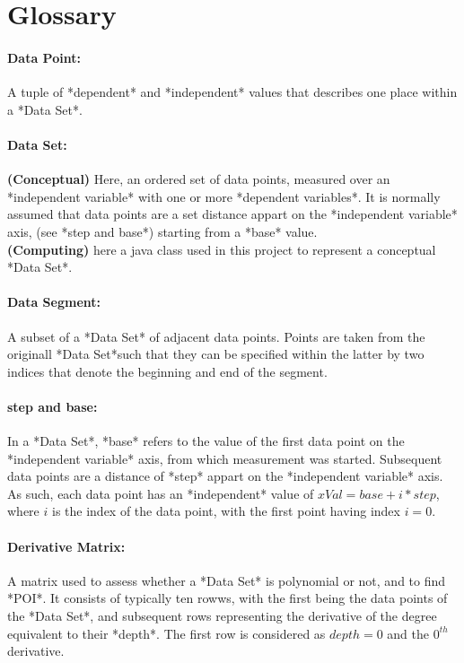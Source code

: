 \documentclass[main.tex]{subfiles}
\begin{document}
  
  \section{Glossary}
  
    \paragraph{Data Point:} A tuple of *dependent* and *independent* values that describes one place within a *Data Set*.
    
    \paragraph{Data Set:} \textbf{(Conceptual)} Here, an ordered set of data points, measured over an *independent variable* with one or more *dependent variables*. It is normally assumed that data points are a set distance appart on the *independent variable* axis, (see *step and base*) starting from a *base* value.  \\
    \textbf{(Computing)} here a java class used in this project to represent a conceptual *Data Set*.
    
    \paragraph{Data Segment:} A subset of a *Data Set* of adjacent data points. Points are taken from the originall *Data Set*such that they can be specified within the latter by two indices that denote the beginning and end of the segment.
    
    \paragraph{step and base:} In a *Data Set*, *base* refers to the value of the first data point on the *independent variable* axis, from which measurement was started. Subsequent data points are a distance of *step* appart on the *independent variable* axis. As such, each data point has an *independent* value of $xVal=base+  i * step$, where $i$ is the index of the data point, with the first point having index $i=0$.
    
    \paragraph{Derivative Matrix:} A matrix used to assess whether a *Data Set* is polynomial or not, and to find *POI*. It consists of typically ten rowws, with the first being the data points of the *Data Set*, and subsequent rows representing the derivative of the degree equivalent to their *depth*. The first row is considered as $depth=0$ and the $0^{th}$ derivative.
    
\end{document}
